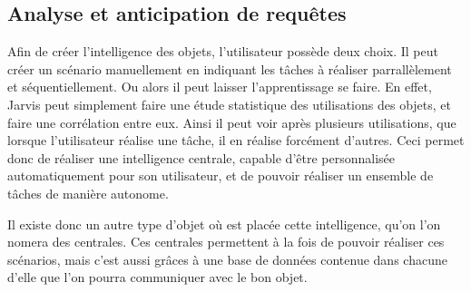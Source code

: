 	\subsection{Analyse et anticipation de requêtes}
Afin de créer l'intelligence des objets, l'utilisateur possède deux choix. Il peut créer un scénario 
manuellement en indiquant les tâches à réaliser parrallèlement et séquentiellement. Ou alors il peut laisser 
l'apprentissage se faire. En effet, Jarvis peut simplement faire une étude statistique des utilisations des 
objets, et faire une corrélation entre eux. Ainsi il peut voir après plusieurs utilisations, que 
lorsque l'utilisateur réalise une tâche, il en réalise forcément d'autres. Ceci permet donc de réaliser 
une intelligence centrale, capable d'être personnalisée automatiquement pour son utilisateur, et de pouvoir 
réaliser un ensemble de tâches de manière autonome.

Il existe donc un autre type d'objet où est placée cette intelligence, qu'on l'on nomera des centrales. Ces 
centrales permettent à la fois de pouvoir réaliser ces scénarios, mais c'est aussi grâces à une base de 
données contenue dans chacune d'elle que l'on pourra communiquer avec le bon objet.
